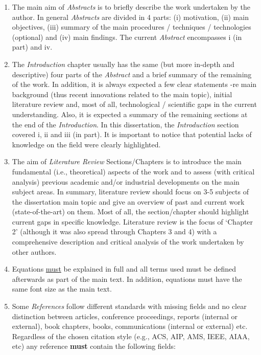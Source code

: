 \documentclass[14pt,twoside]{report}
\begin{document}
\begin{enumerate}
\item The main aim of {\it Abstracts} is to briefly describe the work undertaken by the author. In general {\it Abstracts} are divided in 4 parts: (i) motivation, (ii) main objectives, (iii) summary of the main procedures / techniques / technologies (optional) and (iv) main findings. The current {\it Abstract} encompasses i (in part) and iv.
%
\item The {\it Introduction} chapter usually has the same (but more in-depth and descriptive) four parts of the {\it Abstract} and a brief summary of the remaining of the work. In addition, it is always expected a few clear statements -re main background (thus recent innovations related to the main topic), initial literature review and, most of all, technological / scientific gaps in the current understanding. Also, it is expected a summary of the remaining sections at the end of the {\it Introduction}. In this dissertation, the {\it Introduction} section covered i, ii and iii (in part). It is important to notice that potential lacks of knowledge on the field were clearly highlighted. 
%
\item The aim of {\it Literature Review} Sections/Chapters is to introduce the main fundamental (i.e., theoretical) aspects of the work and to assess (with critical analysis) previous academic and/or industrial developments on the main subject areas. In summary, literature review should focus on 3-5 subjects of the dissertation main topic and give an overview of past and current work (state-of-the-art) on them. Most of all, the section/chapter should highlight current gaps in specific knowledge. Literature review is the focus of `Chapter 2' (although it was also spread through Chapters 3 and 4) with a comprehensive description and critical analysis of the work undertaken by other authors. 
%
\item Equations \underline{must} be explained in full and all terms used must be defined afterwards as part of the main text. In addition, equations must have the same font size as the main text.
%
\item Some {\it References} follow different standards with missing fields and no clear distinction between articles, conference proceedings, reports (internal or external), book chapters, books, communications (internal or external) etc.  Regardless of the chosen citation style (e.g., ACS, AIP, AMS, IEEE, AIAA, etc) any reference {\bf must} contain the following fields: 
\begin{enumerate}

\end{enumerate}
\end{enumerate}
\end{document}
